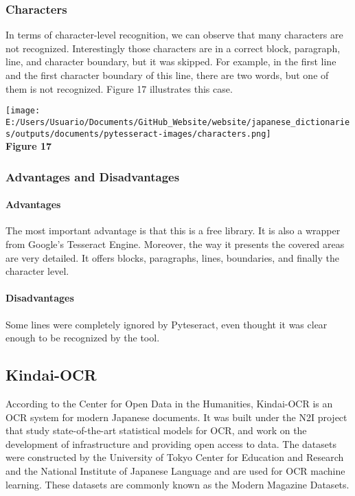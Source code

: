 \documentclass[
]{article}
\begin{document}
\hypertarget{characters-2}{%
\subsubsection{Characters}\label{characters-2}}

In terms of character-level recognition, we can observe that many
characters are not recognized. Interestingly those characters are in a
correct block, paragraph, line, and character boundary, but it was
skipped. For example, in the first line and the first character boundary
of this line, there are two words, but one of them is not recognized.
Figure 17 illustrates this case.

\texttt{[image: E:/Users/Usuario/Documents/GitHub\_Website/website/japanese\_dictionaries/outputs/documents/pytesseract-images/characters.png]}\\
\textbf{Figure 17}

\hypertarget{advantages-and-disadvantages-2}{%
\subsubsection{Advantages and
Disadvantages}\label{advantages-and-disadvantages-2}}

\hypertarget{advantages-2}{%
\paragraph{Advantages}\label{advantages-2}}

The most important advantage is that this is a free library. It is also
a wrapper from Google's Tesseract Engine. Moreover, the way it presents
the covered areas are very detailed. It offers blocks, paragraphs,
lines, boundaries, and finally the character level.

\hypertarget{disadvantages-2}{%
\paragraph{Disadvantages}\label{disadvantages-2}}

Some lines were completely ignored by Pyteseract, even thought it was
clear enough to be recognized by the tool.

\hypertarget{kindai-ocr}{%
\subsection{Kindai-OCR}\label{kindai-ocr}}

According to the Center for Open Data in the Humanities, Kindai-OCR is
an OCR system for modern Japanese documents. It was built under the N2I
project that study state-of-the-art statistical models for OCR, and work
on the development of infrastructure and providing open access to data.
The datasets were constructed by the University of Tokyo Center for
Education and Research and the National Institute of Japanese Language
and are used for OCR machine learning. These datasets are commonly known
as the Modern Magazine Datasets.
\end{document}
